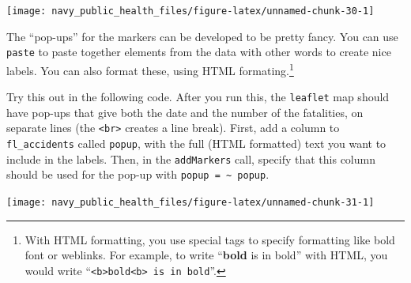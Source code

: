 \documentclass[]{tufte-book}
\newenvironment{Shaded}{}{}
\newcommand{\DataTypeTok}[1]{\textcolor[rgb]{0.56,0.13,0.00}{#1}}
\newcommand{\DecValTok}[1]{\textcolor[rgb]{0.25,0.63,0.44}{#1}}
\newcommand{\FloatTok}[1]{\textcolor[rgb]{0.25,0.63,0.44}{#1}}
\newcommand{\KeywordTok}[1]{\textcolor[rgb]{0.00,0.44,0.13}{\textbf{#1}}}
\newcommand{\NormalTok}[1]{#1}
\newcommand{\OperatorTok}[1]{\textcolor[rgb]{0.40,0.40,0.40}{#1}}
\newcommand{\StringTok}[1]{\textcolor[rgb]{0.25,0.44,0.63}{#1}}
\begin{document}
\texttt{[image: navy\_public\_health\_files/figure-latex/unnamed-chunk-30-1]}

The ``pop-ups'' for the markers can be developed to be pretty fancy. You can use \texttt{paste} to paste
together elements from the data with other words to create nice labels. You can also format these, using
HTML formating.\footnote{With HTML formatting, you use special tags to specify formatting like bold font
  or weblinks. For example, to write ``\textbf{bold} is in bold'' with HTML, you would write
  ``\texttt{\textless{}b\textgreater{}bold\textless{}b\textgreater{}\ is\ in\ bold}''.}

Try this out in the following code. After you run this, the \texttt{leaflet} map should have pop-ups that
give both the date and the number of the fatalities, on separate lines (the \texttt{\textless{}br\textgreater{}} creates a line
break). First, add a column to \texttt{fl\_accidents} called \texttt{popup}, with the full (HTML formatted) text
you want to include in the labels. Then, in the \texttt{addMarkers} call, specify that this column should
be used for the pop-up with \texttt{popup\ =\ \textasciitilde{}\ popup}.

\begin{Shaded}
\end{Shaded}

\texttt{[image: navy\_public\_health\_files/figure-latex/unnamed-chunk-31-1]}
\end{document}

